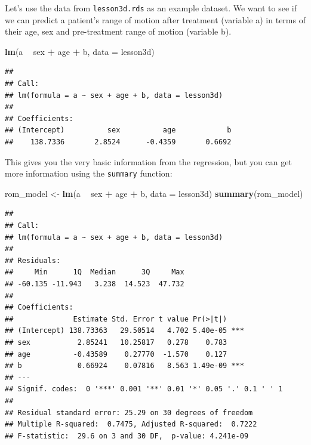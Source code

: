 \documentclass[]{book}
\newenvironment{Shaded}{\begin{snugshade}}{\end{snugshade}}
\newcommand{\DataTypeTok}[1]{\textcolor[rgb]{0.13,0.29,0.53}{#1}}
\newcommand{\KeywordTok}[1]{\textcolor[rgb]{0.13,0.29,0.53}{\textbf{#1}}}
\newcommand{\NormalTok}[1]{#1}
\newcommand{\OperatorTok}[1]{\textcolor[rgb]{0.81,0.36,0.00}{\textbf{#1}}}
\newcommand{\StringTok}[1]{\textcolor[rgb]{0.31,0.60,0.02}{#1}}
\begin{document}
Let's use the data from \texttt{lesson3d.rds} as an example dataset. We want to see if we can predict a patient's range of motion after treatment (variable a) in terms of their age, sex and pre-treatment range of motion (variable b).

\begin{Shaded}
\begin{Highlighting}[]
\KeywordTok{lm}\NormalTok{(a }\OperatorTok{~}\StringTok{ }\NormalTok{sex }\OperatorTok{+}\StringTok{ }\NormalTok{age }\OperatorTok{+}\StringTok{ }\NormalTok{b, }\DataTypeTok{data =}\NormalTok{ lesson3d)}
\end{Highlighting}
\end{Shaded}

\begin{verbatim}
## 
## Call:
## lm(formula = a ~ sex + age + b, data = lesson3d)
## 
## Coefficients:
## (Intercept)          sex          age            b  
##    138.7336       2.8524      -0.4359       0.6692
\end{verbatim}

This gives you the very basic information from the regression, but you can get more information using the \texttt{summary} function:

\begin{Shaded}
\begin{Highlighting}[]
\NormalTok{rom_model <-}\StringTok{ }\KeywordTok{lm}\NormalTok{(a }\OperatorTok{~}\StringTok{ }\NormalTok{sex }\OperatorTok{+}\StringTok{ }\NormalTok{age }\OperatorTok{+}\StringTok{ }\NormalTok{b, }\DataTypeTok{data =}\NormalTok{ lesson3d)}
\KeywordTok{summary}\NormalTok{(rom_model)}
\end{Highlighting}
\end{Shaded}

\begin{verbatim}
## 
## Call:
## lm(formula = a ~ sex + age + b, data = lesson3d)
## 
## Residuals:
##     Min      1Q  Median      3Q     Max 
## -60.135 -11.943   3.238  14.523  47.732 
## 
## Coefficients:
##              Estimate Std. Error t value Pr(>|t|)    
## (Intercept) 138.73363   29.50514   4.702 5.40e-05 ***
## sex           2.85241   10.25817   0.278    0.783    
## age          -0.43589    0.27770  -1.570    0.127    
## b             0.66924    0.07816   8.563 1.49e-09 ***
## ---
## Signif. codes:  0 '***' 0.001 '**' 0.01 '*' 0.05 '.' 0.1 ' ' 1
## 
## Residual standard error: 25.29 on 30 degrees of freedom
## Multiple R-squared:  0.7475, Adjusted R-squared:  0.7222 
## F-statistic:  29.6 on 3 and 30 DF,  p-value: 4.241e-09
\end{verbatim}
\end{document}
